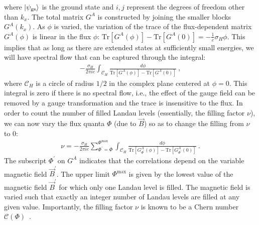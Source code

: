 where \(\ket{\psi_\text{gs}}\) is the ground state and \(i,j\) represent the degrees of freedom other than \(k_x\). The total matrix \(G^A\) is constructed by joining the smaller blocks \(G^A(k_x)\).
As \(\phi\) is varied, the variation of the trace of the flux-dependent matrix \(G^A(\phi)\) is linear in the flux \(\phi\): \(\text{Tr}\left[G^A(\phi)\right] - \text{Tr}\left[G^A(0)\right] = -\frac{1}{e}\sigma_H\phi\).
This implies that as long as there are extended states at sufficiently small energies, we will have spectral flow that can be captured through the integral:
\begin{equation}\begin{aligned}
-\frac{\sigma_H}{2\pi i e}\int_{\mathcal{C}_H} \frac{d\phi}{\text{Tr}\left[G^A(\phi)\right] - \text{Tr}\left[G^A(0)\right]}~,
\end{aligned}\end{equation}
where \(\mathcal{C}_H\) is a circle of radius \(1/2\) in the complex plane centered at \(\phi=0\).
This integral is zero if there is no spectral flow, i.e., the effect of the gauge field can be removed by a gauge transformation and the trace is insensitive to the flux. In order to count the number of filled Landau levels (essentially, the filling factor \(\nu\)), we can now vary the flux quanta \(\Phi\) (due to \(\vec B\)) so as to change the filling from \(\nu\) to 0:
\begin{equation}\begin{aligned}
	\label{landau}
	\nu = -\frac{\sigma_H}{2\pi i e}\sum_{\Phi^\prime=\Phi}^{\Phi^\text{max}}\int_{\mathcal{C}_H} \frac{d\phi}{\text{Tr}\left[G^A_{\Phi^\prime}(\phi)\right] - \text{Tr}\left[G^A_{\Phi^\prime}(0)\right]}~.
\end{aligned}\end{equation}
The subscript \(\Phi^\prime\) on \(G^A\) indicates that the correlations depend on the variable magnetic field \(\vec B^\prime\). The upper limit \(\Phi^\text{max}\) is given by the lowest value of the magnetic field \(\vec B^\prime\) for which only one Landau level is filled. The magnetic field is varied such that exactly an integer number of Landau levels are filled at any given value. Importantly, the filling factor $\nu$ is known to be a Chern number $\mathcal{C}\left(\Phi\right)$~\cite{thouless1982quantized,niu1985quantized}.


